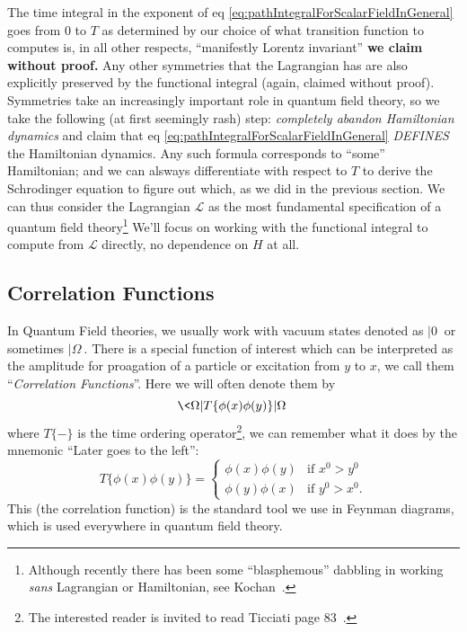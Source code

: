 The time integral in the exponent of eq \eqref{eq:pathIntegralForScalarFieldInGeneral}
goes from 0 to $T$ as determined by our choice of what transition
function to computes is, in all other respects, ``manifestly
Lorentz invariant'' \textbf{we claim without proof.} Any other
symmetries that the Lagrangian has are also explicitly preserved
by the functional integral (again, claimed without
proof). Symmetries take an increasingly important role in quantum
field theory, so we take the following (at first seemingly rash)
step: \emph{completely abandon Hamiltonian dynamics} and claim
that eq \eqref{eq:pathIntegralForScalarFieldInGeneral}
\emph{DEFINES} the Hamiltonian dynamics. Any such formula
corresponds to ``some'' Hamiltonian; and we can alsways
differentiate with respect to $T$ to derive the Schrodinger
equation to figure out which, as we did in the previous
section. We can thus consider the Lagrangian $\mathcal{L}$ as the
most fundamental specification of a quantum field
theory\footnote{Although recently there has been some ``blasphemous'' dabbling in working \emph{sans} Lagrangian or Hamiltonian, see Kochan~\cite{Kochan:2008}.}
We'll focus on working with the functional integral to compute
from $\mathcal{L}$ directly, no dependence on $H$ at all.

\subsection{Correlation Functions} In Quantum Field theories, we
usually work with vacuum states denoted as $|0\>$ or sometimes
$|\Omega\>$. There is a special function of interest which can be
interpreted as the amplitude for proagation of a particle or
excitation from $y$ to $x$, we call them ``\emph{Correlation Functions}''.
Here we will often denote them by
\begin{equation}%
\<\Omega|T\{\phi(x)\phi(y)\}|\Omega\>
\end{equation}
where $T\{-\}$ is the time ordering operator\footnote{The
  interested reader is invited to read Ticciati page
  83~\cite{Ticciati:1999qp}.}, we can remember what it does by
the mnemonic ``Later goes to the left'':
\begin{equation}%
T\{\phi(x)\phi(y)\} = \begin{cases}
\phi(x)\phi(y)&\text{if }x^0>y^0\\
\phi(y)\phi(x)&\text{if }y^0>x^0.
\end{cases}
\end{equation}
This (the correlation function) is the standard tool we use in
Feynman diagrams, which is used everywhere in quantum field
theory.

